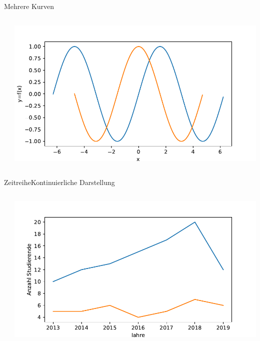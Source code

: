 \documentclass[xelatex,aspectratio=169]{beamer}
\begin{document}
\begin{frame}{Mehrere Kurven}
    \begin{columns}
        \begin{column}{0.5\textwidth}
            \inputminted[firstline=4]{python}{src/plt_multiple.py}
        \end{column}
        \begin{column}{0.5\textwidth}
            \includegraphics[width=\textwidth]{fig/plt_multiple.pdf}
        \end{column}
    \end{columns}
\end{frame}

\begin{frame}{Zeitreihe}{Kontinuierliche Darstellung}
    \begin{columns}
        \begin{column}{0.5\textwidth}
            \inputminted[firstline=4]{python}{src/plt_timeseries_cont.py}
        \end{column}
        \begin{column}{0.5\textwidth}
            \includegraphics[width=\textwidth]{fig/plt_timeseries_cont.pdf}
        \end{column}
    \end{columns}
\end{frame}
\end{document}
